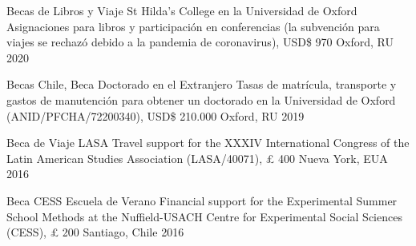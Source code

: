 





\vspace{1mm}

\begin{cvhonors}
\cvhonor
{Becas de Libros y Viaje St Hilda's College en la Universidad de Oxford} 
{Asignaciones para libros y participación en conferencias (la subvención para viajes se rechazó debido a la pandemia de coronavirus), USD{\$} 970} 
{Oxford, RU}
{2020}
\end{cvhonors}

\vspace{1mm}

\begin{cvhonors}
\cvhonor
{Becas Chile, Beca Doctorado en el Extranjero } 
{Tasas de matrícula, transporte y gastos de manutención para obtener un doctorado en la Universidad de Oxford (ANID/PFCHA/72200340), USD{\$} 210.000}
{Oxford, RU}
{2019}
\end{cvhonors}

\vspace{1mm}

\begin{cvhonors}
\cvhonor
{Beca de Viaje LASA} 
{Travel support for the XXXIV International Congress of the Latin American Studies Association (LASA/40071), {\pounds} 400}
{Nueva York, EUA}
{2016}
\end{cvhonors}

\vspace{1mm}

\begin{cvhonors}
\cvhonor
{Beca CESS Escuela de Verano}
{Financial support for the Experimental Summer School Methods at the Nuffield-USACH Centre for Experimental Social Sciences (CESS), {\pounds} 200}
{Santiago, Chile}
{2016}
\end{cvhonors}

